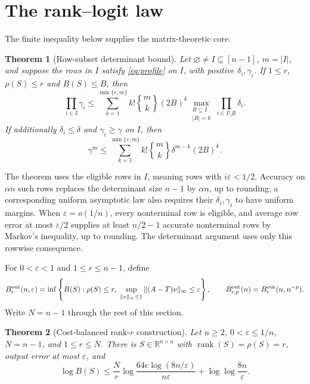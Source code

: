 \documentclass[10pt]{article}
\newtheorem{theorem}{Theorem}
\theoremstyle{definition}
\DeclareMathOperator{\rank}{rank}
\newcommand{\R}{\mathbb R}
\newcommand{\Stirling}[2]{\genfrac{\{}{\}}{0pt}{}{#1}{#2}}
\begin{document}
\section{The rank--logit law}

The finite inequality below supplies the matrix-theoretic core.

\begin{theorem}[Row-subset determinant bound]\label{thm:subset}
Let \(\varnothing\ne I\subseteq[n-1]\), \(m=|I|\), and suppose the rows in
\(I\) satisfy \eqref{eq:profile} on \(I\), with positive
\(\delta_i,\gamma_i\).  If \(1\le r\),
\(\rho(S)\le r\) and \(B(S)\le B\), then
\begin{equation}\label{eq:weighted}
 \prod_{i\in I}\gamma_i
 \le
 \sum_{k=1}^{\min\{r,m\}}
 k!\Stirling{m}{k}(2B)^k
 \max_{\substack{R\subseteq I\\|R|=k}}
 \prod_{i\in I\setminus R}\delta_i .
\end{equation}
If additionally \(\delta_i\le\delta\) and
\(\gamma_i\ge\gamma\) on \(I\), then
\begin{equation}\label{eq:constant}
 \gamma^m\le
 \sum_{k=1}^{\min\{r,m\}}
 k!\Stirling{m}{k}\delta^{m-k}(2B)^k .
\end{equation}
\end{theorem}

The theorem uses the eligible rows in \(I\), meaning rows with
\(i\varepsilon<1/2\).  Accuracy on \(\alpha n\) such rows replaces the
determinant size \(n-1\) by \(\alpha n\), up to rounding; a corresponding
uniform asymptotic law also requires their \(\delta_i,\gamma_i\) to have
uniform margins.  When
\(\varepsilon=o(1/n)\), every nonterminal row is eligible, and average row
error at most \(\varepsilon/2\) supplies at least \(n/2-1\) accurate
nonterminal rows by Markov's inequality, up to rounding.  The determinant
argument uses only this rowwise consequence.

For \(0<\varepsilon<1\) and \(1\le r\le n-1\), define
\[
 B^{\rm out}_{r}(n,\varepsilon)=\inf\left\{B(S):
 \rho(S)\le r,\ 
 \sup_{\|v\|_\infty\le1}\|(A-T)v\|_\infty\le\varepsilon\right\},
 \qquad B^{\rm out}_{r,p}(n)=B^{\rm out}_{r}(n,n^{-p}).
\]
Write \(N=n-1\) through the rest of this section.

\begin{theorem}[Cost-balanced rank-\(r\) construction]\label{thm:upper}
Let \(n\ge2\), \(0<\varepsilon\le1/n\), \(N=n-1\), and
\(1\le r\le N\).  There is \(S\in\R^{n\times n}\) with
\(\rank(S)=\rho(S)=r\), output error at most \(\varepsilon\), and
\begin{equation}\label{eq:upperbudget}
 \log B(S)\le
 \frac Nr\log\frac{64e\log(8n/\varepsilon)}{n\varepsilon}
 +\log\log\frac{8n}{\varepsilon}.
\end{equation}
\end{theorem}
\end{document}
